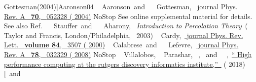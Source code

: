 \documentclass[prl,twocolumn,aps,showpacs,amsmath,amssymb,superscriptaddress,floatfix,longbibliography]{revtex4-1}
\begin{document}
\begin{thebibliography}{39}
{  {Gottesman}(2004)}]{Aaronson04}\BibitemOpen
   { {~\bibnamefont
  {Aaronson}}\ and\  {~\bibnamefont
  {Gottesman}},\ }\href {\doibase 10.1103/PhysRevA.70.052328} {\bibfield
  {journal} { {Phys. Rev. A}\ }\textbf {
  {70}},\  {052328} ( {2004})}\BibitemShut
  {NoStop}\BibitemOpen
  \href@noop {} {} {See online supplemental material for
  details. See also Ref.~\cite{Ito1993,kz}}\BibitemOpen
   { {~\bibnamefont
  {Stauffer}}\ and\  {~\bibnamefont
  {Aharony}},\ }\href@noop {} {\emph { {Introduction to
  Percolation Theory}}}\ ( {Taylor and Francis,
  London/Philadelphia},\  {2003})\BibitemOpen
   { {~\bibnamefont
  {Cardy}},\ }\href {\doibase 10.1103/PhysRevLett.84.3507} {\bibfield
  {journal} { {Phys. Rev. Lett.}\ }\textbf {\bibinfo
  {volume} {84}},\  {3507} (
  {2000})}\BibitemOpen
   { {~\bibnamefont
  {Calabrese}}\ and\  {~\bibnamefont
  {Lefevre}},\ }\href {\doibase 10.1103/PhysRevA.78.032329} {\bibfield
  {journal} { {Phys. Rev. A}\ }\textbf {
  {78}},\  {032329} ( {2008})}\BibitemShut
  {NoStop}\BibitemOpen
   { {\ \bibnamefont
  {Villalobos}},  {\bibfnamefont {M.}~\bibnamefont
  {Parashar}}, \bibinfo {author} {\bibfnamefont {I.}~}, \
  and\  {~},\
  }\href {\doibase 10.13140/RG.2.2.11579.87846} {\enquote {
  {High performance computing at the rutgers discovery informatics
  institute},}\ } (\bibinfo {year} {2018})\BibitemShut {NoStop}\bibitem [{\ and\ \citenamefont
}
\end{thebibliography}
\end{document}
